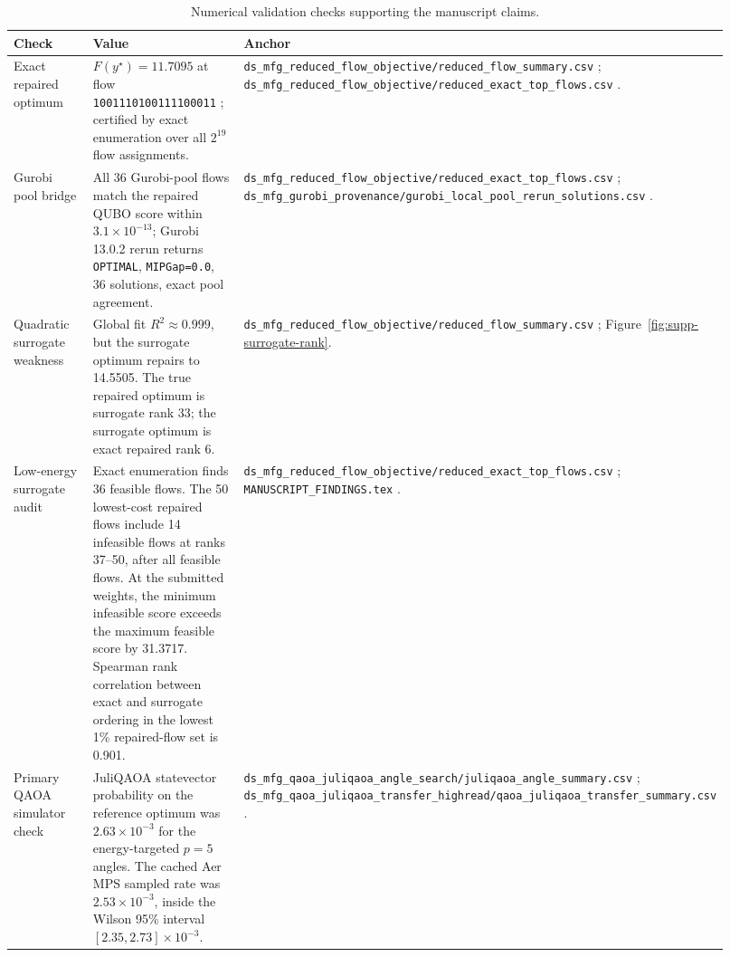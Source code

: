 \documentclass[10pt,letterpaper]{article}
\DeclareRobustCommand{\artifact}[1]{%
  {\begingroup\urlstyle{tt}\footnotesize\nolinkurl{#1}\endgroup}%
}
\DeclareRobustCommand{\codeid}[1]{%
  {\begingroup\urlstyle{tt}\nolinkurl{#1}\endgroup}%
}
\begin{document}
\begin{table}[t]
\centering
\footnotesize
\caption{Numerical validation checks supporting the manuscript claims.}
\label{tab:supp-validation-facts}
\setlength{\tabcolsep}{3pt}
\begin{tabular}{L{0.25\linewidth}L{0.40\linewidth}L{0.27\linewidth}}
\hline
Check & Value & Anchor \\
\hline
Exact repaired optimum &
$F(y^\star)=11.7095$ at flow
\codeid{1001110100111100011}; certified by exact enumeration over all
$2^{19}$ flow assignments. &
\artifact{ds\_mfg\_reduced\_flow\_objective/reduced\_flow\_summary.csv};
\artifact{ds\_mfg\_reduced\_flow\_objective/reduced\_exact\_top\_flows.csv}. \\
\hline
Gurobi pool bridge &
All 36 Gurobi-pool flows match the repaired QUBO score within
$3.1\times 10^{-13}$; Gurobi 13.0.2 rerun returns \texttt{OPTIMAL},
\texttt{MIPGap=0.0}, 36 solutions, exact pool agreement. &
\artifact{ds\_mfg\_reduced\_flow\_objective/reduced\_exact\_top\_flows.csv};
\artifact{ds\_mfg\_gurobi\_provenance/gurobi\_local\_pool\_rerun\_solutions.csv}. \\
\hline
Quadratic surrogate weakness &
Global fit $R^2 \approx 0.999$, but the surrogate optimum repairs to 14.5505.
The true repaired optimum is surrogate rank 33; the surrogate optimum is exact
repaired rank 6. &
\artifact{ds\_mfg\_reduced\_flow\_objective/reduced\_flow\_summary.csv};
Figure~\ref{fig:supp-surrogate-rank}. \\
\hline
Low-energy surrogate audit &
Exact enumeration finds 36 feasible flows. The 50 lowest-cost repaired flows
include 14 infeasible flows at ranks 37--50, after all feasible flows.
At the submitted weights, the minimum infeasible score exceeds the maximum
feasible score by 31.3717. Spearman rank correlation between
exact and surrogate ordering in the lowest 1\% repaired-flow set is 0.901. &
\artifact{ds\_mfg\_reduced\_flow\_objective/reduced\_exact\_top\_flows.csv};
\artifact{MANUSCRIPT\_FINDINGS.tex}. \\
\hline
Primary QAOA simulator check &
JuliQAOA statevector probability on the reference optimum was
$2.63\times10^{-3}$ for the energy-targeted $p=5$ angles. The cached Aer MPS
sampled rate was $2.53\times10^{-3}$, inside the Wilson 95\% interval
$[2.35,2.73]\times10^{-3}$. &
\artifact{ds\_mfg\_qaoa\_juliqaoa\_angle\_search/juliqaoa\_angle\_summary.csv};
\artifact{ds\_mfg\_qaoa\_juliqaoa\_transfer\_highread/qaoa\_juliqaoa\_transfer\_summary.csv}. \\
\hline
\end{tabular}
\end{table}
\end{document}
